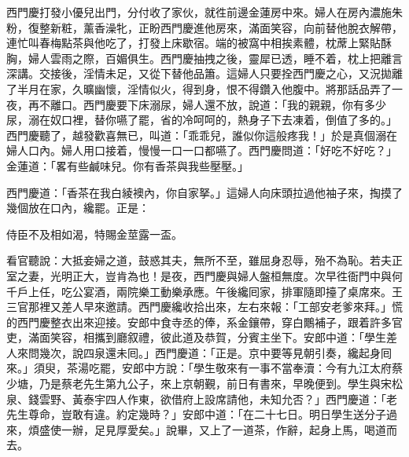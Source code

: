 西門慶打發小優兒出門，分付收了家伙，就徃前邊金蓮房中來。婦人在房內濃施朱粉，復整新粧，薰香澡牝，正盼西門慶進他房來，滿面笑容，向前替他脫衣解帶，連忙叫春梅點茶與他吃了，打發上床歇宿。端的被窩中相挨素體，枕蓆上緊貼酥胸，婦人雲雨之際，百媚俱生。西門慶抽拽之後，靈犀已透，睡不着，枕上把離言深講。交接後，淫情未足，又從下替他品簫。這婦人只要拴西門慶之心，又況拋離了半月在家，久曠幽懷，淫情似火，得到身，恨不得鑽入他腹中。將那話品弄了一夜，再不離口。西門慶要下床溺尿，婦人還不放，說道：「我的親親，你有多少尿，溺在奴口裡，替你嚥了罷，省的冷呵呵的，熱身子下去凍着，倒值了多的。」{}西門慶聽了，越發歡喜無已，叫道：「乖乖兒，誰似你這般疼我！」於是真個溺在婦人口內。婦人用口接着，慢慢一口一口都嚥了。西門慶問道：「好吃不好吃？」{}金蓮道：「畧有些鹹味兒。{}你有香茶與我些壓壓。」

西門慶道：「香茶在我白綾襖內，你自家拏。」這婦人向床頭拉過他袖子來，掏摸了幾個放在口內，纔罷。正是：

\begin{myquote}
侍臣不及相如渴，特賜金莖露一盃。
\end{myquote}

看官聽說：大抵妾婦之道，鼓惑其夫，無所不至，雖屈身忍辱，殆不為恥。若夫正室之妻，光明正大，豈肯為也！是夜，西門慶與婦人盤桓無度。次早徃衙門中與何千戶上任，吃公宴酒，兩院樂工動樂承應。午後纔囘家，排軍隨即擡了桌席來。王三官那裡又差人早來邀請。西門慶纔收拾出來，左右來報：「工部安老爹來拜。」慌的西門慶整衣出來迎接。安郎中食寺丞的俸，系金鑲帶，穿白鷳補子，跟着許多官吏，滿面笑容，相攜到廳叙禮，彼此道及恭賀，分賓主坐下。安郎中道：「學生差人來問幾次，說四泉還未囘。」西門慶道：「正是。京中要等見朝引奏，纔起身囘來。」須臾，茶湯吃罷，安郎中方說：「學生敬來有一事不當奉瀆：今有九江太府蔡少塘，乃是蔡老先生第九公子，來上京朝覲，前日有書來，早晚便到。學生與宋松泉、錢雲野、黃泰宇四人作東，欲借府上設席請他，未知允否？」西門慶道：「老先生尊命，豈敢有違。約定幾時？」安郎中道：「在二十七日。明日學生送分子過來，煩盛使一辦，足見厚愛矣。」說畢，又上了一道茶，作辭，起身上馬，喝道而去。

